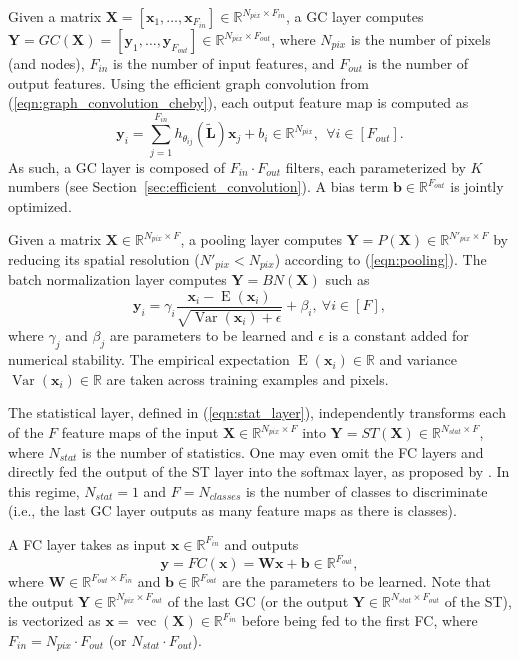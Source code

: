 \documentclass[final,twocolumn,3p,times,authoryear]{elsarticle}
\newcommand{\secref}[1]{Section~\ref{sec:#1}}
\newcommand{\eqnref}[1]{(\ref{eqn:#1})}
\renewcommand{\b}[1]{{\bm{#1}}}   %
\newcommand{\1}{\b{1}}              %
\newcommand{\0}{\b{0}}              %
\renewcommand{\L}{\b{L}}
\newcommand{\tL}{\tilde{\L}}
\newcommand{\W}{\b{W}}
\newcommand{\x}{\b{x}}
\newcommand{\X}{\b{X}}
\newcommand{\y}{\b{y}}
\newcommand{\Y}{\b{Y}}
\newcommand{\R}{\mathbb{R}}
\DeclareMathOperator*{\esp}{E}
\DeclareMathOperator*{\var}{Var}
\DeclareMathOperator*{\vect}{vec}
\begin{document}
Given a matrix $\X = [\x_1, \ldots, \x_{F_{in}}] \in \R^{N_{pix} \times F_{in}}$, a GC layer computes $\Y = GC(\X) = [\y_1, \ldots, \y_{F_{out}}] \in \R^{N_{pix} \times F_{out}}$, where $N_{pix}$ is the number of pixels (and nodes), $F_{in}$ is the number of input features, and $F_{out}$ is the number of output features.
Using the efficient graph convolution from \eqnref{graph_convolution_cheby}, each output feature map is computed as
\begin{equation*}
	\y_i = \sum_{j=1}^{F_{in}} h_{\theta_{ij}}(\tL) \x_j + b_i \in \R^{N_{pix}}, \ \ \forall i \in [F_{out}].
\end{equation*}
As such, a GC layer is composed of $F_{in} \cdot F_{out}$ filters, each parameterized by $K$ numbers (see \secref{efficient_convolution}). A bias term $\b b \in \R^{F_{out}}$ is jointly optimized.

Given a matrix $\X \in \R^{N_{pix} \times F}$, a pooling layer computes $\Y = P(\X) \in \R^{N'_{pix} \times F}$ by reducing its spatial resolution ($N'_{pix} < N_{pix}$) according to \eqnref{pooling}.
The batch normalization layer \citep{ioffe2015batchnorm} computes $\Y = BN(\X)$ such as
\begin{equation*}
	\y_i = \gamma_i \frac{\x_i - \esp(\x_i)}{\sqrt{\var(\x_i) + \epsilon}} + \beta_i, \ \forall i \in [F],
\end{equation*}
where $\gamma_{j}$ and $\beta_{j}$ are parameters to be learned and $\epsilon$ is a constant added for numerical stability. The empirical expectation $\esp(\x_i) \in \R$ and variance $\var(\x_i) \in \R$ are taken across training examples and pixels.

The statistical layer, defined in \eqnref{stat_layer}, independently transforms each of the $F$ feature maps of the input $\X \in \R^{N_{pix} \times F}$ into $\Y = ST(\X) \in \R^{N_{stat} \times F}$, where $N_{stat}$ is the number of statistics. One may even omit the FC layers and directly fed the output of the ST layer into the softmax layer, as proposed by \citet{lin2013globalavgpooling}. In this regime, $N_{stat} = 1$ and $F = N_{classes}$ is the number of classes to discriminate (i.e., the last GC layer outputs as many feature maps as there is classes).

A FC layer takes as input $\x \in \R^{F_{in}}$ and outputs
\begin{equation*}
	\y = FC(\x) = \b W \x + \b b \in \R^{F_{out}} ,
\end{equation*}
where $\W \in \R^{F_{out} \times F_{in}}$ and $\b b \in \R^{F_{out}}$ are the parameters to be learned.
Note that the output $\Y \in \R^{N_{pix} \times F_{out}}$ of the last GC (or the output $\Y \in \R^{N_{stat} \times F_{out}}$ of the ST), is vectorized as $\x = \vect(\X) \in \R^{F_{in}}$ before being fed to the first FC, where $F_{in} = N_{pix} \cdot F_{out}$ (or $N_{stat} \cdot F_{out}$).
\end{document}
